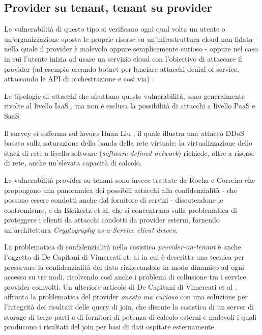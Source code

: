 \documentclass[../main.tex]{subfiles}
\begin{document}
\subsection{Provider su tenant, tenant su provider}
Le vulnerabilità di questo tipo si verificano ogni qual volta un utente o un'organizzazione sposta le proprie risorse su un'infrastruttura cloud non fidata - nella quale il provider è malevolo oppure semplicemente curioso - oppure nel caso in cui l'utente inizia ad usare un servizio cloud con l'obiettivo di attaccare il provider (ad esempio creando botnet per lanciare attacchi denial of service, attaccando le API di orchestrazione e così via) \cite{Ardagna:2015:SAC:2808687.2767005}.


Le tipologie di attacchi che sfruttano queste vulnerabilità, sono generalmente rivolte al livello IaaS \cite{Ardagna:2015:SAC:2808687.2767005}, ma non è esclusa la possibilità di attacchi a livello PaaS e SaaS.

Il survey si sofferma sul lavoro Huan Liu \cite{Liu:2010:NFD:1866835.1866849}, il quale illustra una attacco DDoS basato sulla saturazione della banda della rete virtuale: la virtualizzazione dello stack di rete a livello software (\textit{software-defined network}) richiede, oltre a risorse di rete, anche un'elevata capacità di calcolo.


Le vulnerabilità provider su tenant sono invece trattate da Rocha e Correira \cite{Ieee5958798} che propongono una panoramica dei possibili attacchi alla confidenzialità - che possono essere condotti anche dal fornitore di servizi - discutendone le contromisure, e da Bleikertz et al. \cite{Bleikertz:2013:CCC:2524523.2524526} che si concentrano sulla problematica di proteggere i clienti da attacchi condotti da provider esterni, fornendo un'architettura \textit{Cryptography as-a-Service client-driven}.


La problematica di confidenzialità nella casistica \textit{provider-on-tenant} è anche l'oggetto di De Capitani di Vimercati et. al \cite{Ieee7134727} in cui è descritta una tecnica per preservare la confidenzialità del dato riallocandolo in modo dinamico ad ogni accesso su tre nodi, risolvendo così anche i problemi di collusione tra i service provider coinvolti.
Un ulteriore articolo di De Capitani di Vimercati et al \cite{Ieee6681865}. affronta la problematica del provider \textit{onesto ma curioso} con una soluzione per l'integrità dei risultati delle query di join, che discute la casistica di un server di storage di terze parti e di fornitori di potenza di calcolo esterni e malevoli i quali producono i risultati del join per basi di dati ospitate esternamente.
\end{document}
